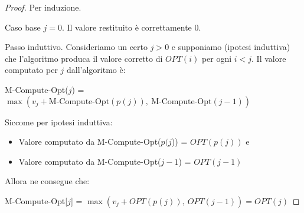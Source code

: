 \begin{proof}
Per induzione.
\medbreak

Caso base $j = 0$. Il valore restituito è correttamente 0.
\medbreak

Passo induttivo. Consideriamo un certo $j > 0$ e supponiamo (ipotesi induttiva) 
che l'algoritmo produca il valore corretto di $\mathit{OPT}(i)$ per ogni $i < j$.
Il valore computato per $j$ dall'algoritmo è:
\bigbreak

M-Compute-Opt($j$) = $\max(v_j + \text{M-Compute-Opt}(p(j)),\
\text{M-Compute-Opt}(j - 1))$
\bigbreak

Siccome per ipotesi induttiva:
\begin{itemize}
    \item Valore computato da M-Compute-Opt($p(j$)) = $\mathit{OPT}(p(j))$ e
    \item Valore computato da M-Compute-Opt($j - 1$) = $\mathit{OPT}(j - 1)$
\end{itemize}
\newpage

Allora ne consegue che:
\bigbreak

M-Compute-Opt[$j$] = $\max(v_j + \mathit{OPT}(p(j)),\
\mathit{OPT}(j - 1)) = \mathit{OPT}(j)$
\end{proof}

\newpage